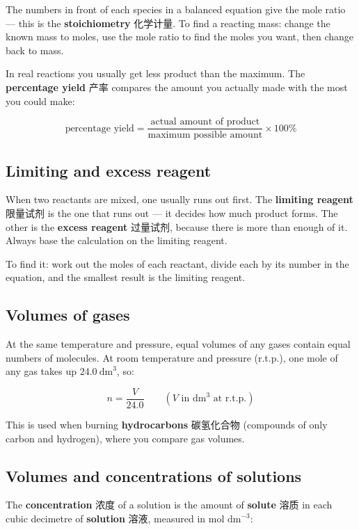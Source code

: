 \documentclass[11pt]{article}
\begin{document}
The numbers in front of each species in a balanced equation give the mole ratio — this is the \textbf{stoichiometry} 化学计量. To find a reacting mass: change the known mass to moles, use the mole ratio to find the moles you want, then change back to mass.

In real reactions you usually get less product than the maximum. The \textbf{percentage yield} 产率 compares the amount you actually made with the most you could make:

\[
\text{percentage yield} = \frac{\text{actual amount of product}}{\text{maximum possible amount}} \times 100\%
\]

\subsection*{Limiting and excess reagent}

When two reactants are mixed, one usually runs out first. The \textbf{limiting reagent} 限量试剂 is the one that runs out — it decides how much product forms. The other is the \textbf{excess reagent} 过量试剂, because there is more than enough of it. Always base the calculation on the limiting reagent.

To find it: work out the moles of each reactant, divide each by its number in the equation, and the smallest result is the limiting reagent.

\subsection*{Volumes of gases}

At the same temperature and pressure, equal volumes of any gases contain equal numbers of molecules. At room temperature and pressure (r.t.p.), one mole of any gas takes up $24.0\ \text{dm}^3$, so:

\[
n = \frac{V}{24.0}\qquad (V \text{ in } \text{dm}^3 \text{ at r.t.p.})
\]

This is used when burning \textbf{hydrocarbons} 碳氢化合物 (compounds of only carbon and hydrogen), where you compare gas volumes.

\subsection*{Volumes and concentrations of solutions}

The \textbf{concentration} 浓度 of a solution is the amount of \textbf{solute} 溶质 in each cubic decimetre of \textbf{solution} 溶液, measured in $\text{mol dm}^{-3}$:
\end{document}
